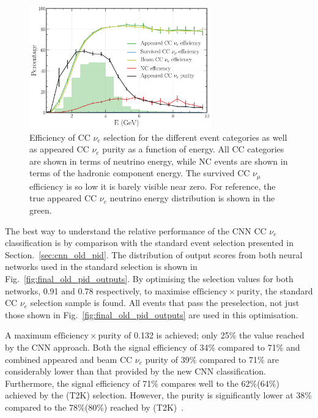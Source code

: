 \begin{figure} %
    \includegraphics[width=0.7\textwidth]{diagrams/7-results/final_nuel_hists.pdf}
    \caption[Efficiency of CC $\nu_{e}$ selection as a function of energy]
    {Efficiency of CC $\nu_{e}$ selection for the different event categories as well as appeared CC
        $\nu_{e}$ purity as a function of energy. All CC categories are shown in terms of neutrino
        energy, while NC events are shown in terms of the hadronic component energy. The survived CC
        $\nu_{\mu}$ efficiency is so low it is barely visible near zero. For reference, the true
        appeared CC $\nu_{e}$ neutrino energy distribution is shown in the green.}
    \label{fig:final_nuel_hists}
\end{figure}

The best way to understand the relative performance of the CNN CC $\nu_{e}$ classification is by
comparison with the standard event selection presented in Section.~\ref{sec:cnn_old_pid}. The
distribution of output scores from both neural networks used in the standard selection is shown in
Fig.~\ref{fig:final_old_pid_outputs}. By optimising the selection values for both networks, 0.91
and 0.78 respectively, to maximise $\mathrm{efficiency}\times\mathrm{purity}$, the standard CC
$\nu_{e}$ selection sample is found. All events that pass the preselection, not just those shown
in Fig.~\ref{fig:final_old_pid_outputs} are used in this optimisation.

A maximum $\mathrm{efficiency}\times\mathrm{purity}$ of 0.132 is achieved; only 25\% the value
reached by the CNN approach. Both the signal efficiency of 34\% compared to 71\% and combined
appeared and beam CC $\nu_{e}$ purity of 39\% compared to 71\% are considerably lower than that
provided by the new CNN classification. Furthermore, the signal efficiency of 71\% compares well
to the 62\%(64\%) achieved by the \nova(T2K) selection. However, the purity is significantly lower
at 38\% compared to the 78\%(80\%) reached by \nova(T2K)~\cite{acero2019, abe2015}.

